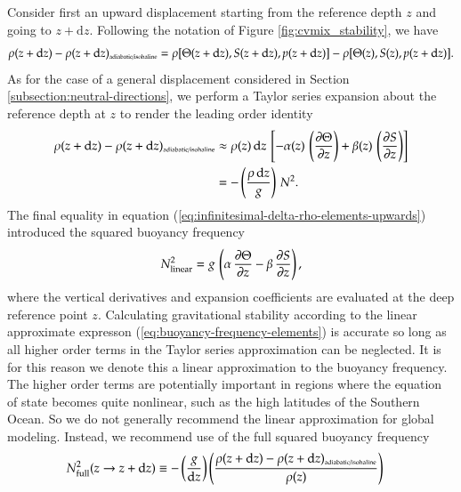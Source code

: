 Consider first an upward displacement starting from the reference
depth $z$ and going to $z+\mathrm{d}z$.  Following the notation of
Figure \ref{fig:cvmix_stability}, we have
\begin{equation}
\rho(z+\mathrm{d} z)  - \rho(z+\mathrm{d} z)_{\mbox{\tiny adiabatic/isohaline}}  
= 
 \rho[ \Theta(z + \mathrm{d} z), S(z + \mathrm{d} z), p(z + \mathrm{d} z)]
-
\rho[ \Theta(z), S(z), p(z + \mathrm{d}z)].
\end{equation}
As for the case of a general displacement considered in Section
\ref{subsection:neutral-directions}, we perform a Taylor series
expansion about the reference depth at $z$ to render the leading order
identity
\begin{equation}
\begin{split}
\rho(z+\mathrm{d} z)  - \rho(z+\mathrm{d} z)_{\mbox{\tiny adiabatic/isohaline}}  
&\approx 
  \rho(z) \, \mathrm{d}z \, \left[ 
   -\alpha(z) \, \left( \frac{\partial \Theta}{\partial z} \right )
 + \beta(z) \, \left( \frac{\partial S}{\partial z} \right) \right]
 \\
&= 
 -\left( \frac{\rho \, \mathrm{d}z}{g} \right) \, N^{2}.
\end{split}
\label{eq:infinitesimal-delta-rho-elements-upwards}
\end{equation}
The final equality in equation
(\ref{eq:infinitesimal-delta-rho-elements-upwards}) introduced the
squared buoyancy frequency
 \begin{equation}
 N^{2}_{\mbox{\scriptsize linear}} = g \, \left( \alpha \, \frac{\partial \Theta}{\partial z} 
                         - \beta  \, \frac{\partial S}{\partial z} \right),
\label{eq:buoyancy-frequency-elements}
\end{equation}
where the vertical derivatives and expansion coefficients are
evaluated at the deep reference point $z$.  Calculating gravitational
stability according to the linear approximate expresson
(\ref{eq:buoyancy-frequency-elements}) is accurate so long as all
higher order terms in the Taylor series approximation can be
neglected.  It is for this reason we denote this a linear
approximation to the buoyancy frequency.  The higher order terms are
potentially important in regions where the equation of state becomes
quite nonlinear, such as the high latitudes of the Southern Ocean.  So
we do not generally recommend the linear approximation for global
modeling.  Instead, we recommend use of the full squared buoyancy
frequency
\begin{equation}
\begin{split}
 N^{2}_{\mbox{\scriptsize full}}(z \rightarrow z+\mathrm{d}z) &\equiv 
 -\left( \frac{g}{\mathrm{d}z} \right) 
   \left( \frac{\rho(z+\mathrm{d} z)  - \rho(z+\mathrm{d} z)_{\mbox{\tiny adiabatic/isohaline}} } {\rho(z) } \right)
\end{split}
\label{eq:infinitesimal-delta-rho-elements-upwards-B}
\end{equation}

